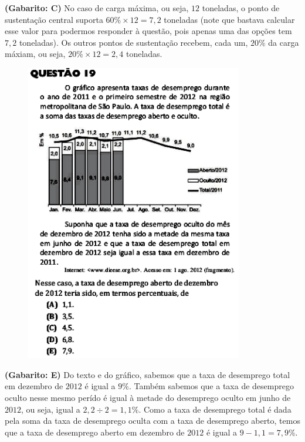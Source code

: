 \documentclass[a4paper]{article}
\begin{document}
\par\textbf{(Gabarito: C)} No caso de carga máxima, ou seja, $12$ toneladas, o ponto de sustentação central suporta $60\%\times 12 = 7,2$ toneladas (note que bastava calcular esse valor para podermos responder à questão, pois apenas uma das opções tem $7,2$ toneladas). Os outros pontos de sustentação recebem, cada um, $20\%$ da carga máxiam, ou seja, $20\%\times 12 = 2,4$ toneladas.
\begin{figure}[H]
	\begin{center}
		\includegraphics[width=9.5cm]{L3Q19.png}
	\end{center}
\end{figure}
\par\textbf{(Gabarito: E)} Do texto e do gráfico, sabemos que a taxa de desemprego total em dezembro de $2012$ é igual a $9\%$. Também sabemos que a taxa de desemprego oculto nesse mesmo perído é igual à metade do desemprego oculto em junho de $2012$, ou seja, igual a $2,2\div 2 = 1,1\%$. Como a taxa de desemprego total é dada pela soma da taxa de desemprego oculta com a taxa de desemprego aberto, temos que a taxa de desemprego aberto em dezembro de $2012$ é igual a $9 - 1,1 = 7,9\%$.
\end{document}
